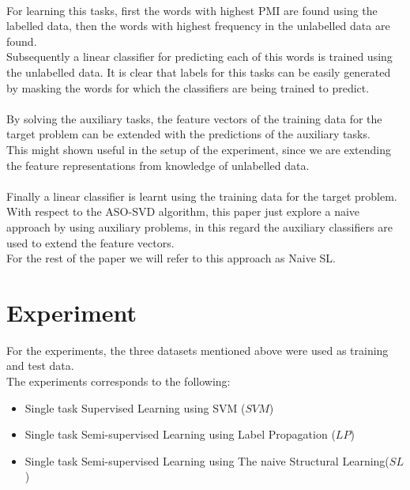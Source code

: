 \documentclass[4pt,a4paper,twocolumn]{article}
\begin{document}
\\
For learning this tasks, first the words with highest PMI are found using the labelled data, then the words with highest frequency in the unlabelled data are found.\\
Subsequently a linear classifier for predicting each of this words is trained using the unlabelled data.
It is clear that labels for this tasks can be easily generated by masking the words for which the classifiers are being trained to predict.\\
\\
By solving the auxiliary tasks, the feature vectors of the training data for the target problem can be extended with the predictions of the auxiliary tasks.\\
This might shown useful in the setup of the experiment, since we are extending the feature representations from knowledge of unlabelled data.\\
\\
Finally a linear classifier is learnt using the training data for the target problem.\\
With respect to the ASO-SVD algorithm, this paper just explore a naive approach by using auxiliary problems, in this regard the auxiliary classifiers are used to extend the feature vectors.\\
For the rest of the paper we will refer to this approach as Naive SL.


\section{Experiment}
For the experiments, the three datasets mentioned above were used as training and test data.\\
The experiments corresponds to the following:
\begin{itemize}
	\item Single task Supervised Learning using SVM ($SVM$)
	\item Single task Semi-supervised Learning using Label Propagation ($LP$)
	\item Single task Semi-supervised Learning using The naive Structural Learning($SL$)
	
\end{itemize}
\end{document}
